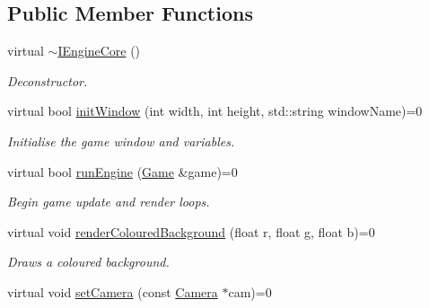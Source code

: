 \subsection*{Public Member Functions}
\begin{DoxyCompactItemize}
\item 
\hypertarget{class_i_engine_core_a500720d444543140a1f4f1f80e03d87a}{virtual \hyperlink{class_i_engine_core_a500720d444543140a1f4f1f80e03d87a}{$\sim$\+I\+Engine\+Core} ()}\label{class_i_engine_core_a500720d444543140a1f4f1f80e03d87a}

\begin{DoxyCompactList}\small\item\em Deconstructor. \end{DoxyCompactList}\item 
\hypertarget{class_i_engine_core_a27123704f8f24eefd9cb47aa9986cbf3}{virtual bool \hyperlink{class_i_engine_core_a27123704f8f24eefd9cb47aa9986cbf3}{init\+Window} (int width, int height, std\+::string window\+Name)=0}\label{class_i_engine_core_a27123704f8f24eefd9cb47aa9986cbf3}

\begin{DoxyCompactList}\small\item\em Initialise the game window and variables. \end{DoxyCompactList}\item 
\hypertarget{class_i_engine_core_ad03940f571ec20ba7427feeca44ace21}{virtual bool \hyperlink{class_i_engine_core_ad03940f571ec20ba7427feeca44ace21}{run\+Engine} (\hyperlink{class_game}{Game} \&game)=0}\label{class_i_engine_core_ad03940f571ec20ba7427feeca44ace21}

\begin{DoxyCompactList}\small\item\em Begin game update and render loops. \end{DoxyCompactList}\item 
\hypertarget{class_i_engine_core_a8f8e0778f04c50b680cdde167cb38e2f}{virtual void \hyperlink{class_i_engine_core_a8f8e0778f04c50b680cdde167cb38e2f}{render\+Coloured\+Background} (float r, float g, float b)=0}\label{class_i_engine_core_a8f8e0778f04c50b680cdde167cb38e2f}

\begin{DoxyCompactList}\small\item\em Draws a coloured background. \end{DoxyCompactList}\item 
\hypertarget{class_i_engine_core_ab2f643ce25708c87b20eecdcbb18b9ac}{virtual void \hyperlink{class_i_engine_core_ab2f643ce25708c87b20eecdcbb18b9ac}{set\+Camera} (const \hyperlink{class_camera}{Camera} $\ast$cam)=0}\label{class_i_engine_core_ab2f643ce25708c87b20eecdcbb18b9ac}


\end{DoxyCompactItemize}
